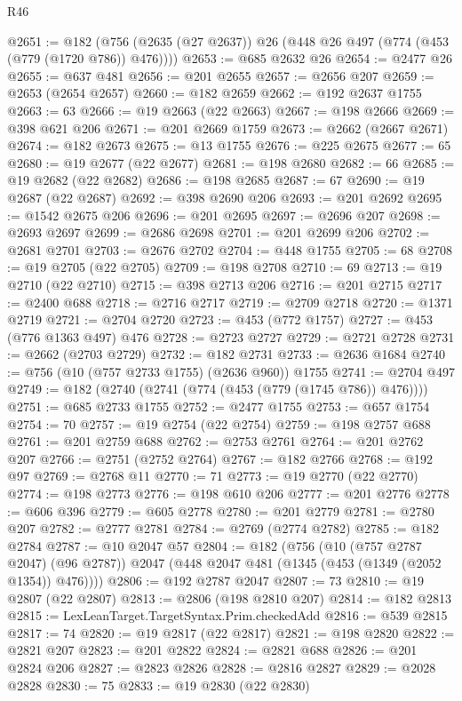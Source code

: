 \begin{lexlean}{R46}
\begin{coremodule}
@2651 := @182 (@756 (@2635 (@27 @2637)) @26 (@448 @26 @497 (@774 (@453 (@779 (@1720 @786)) @476))))
@2653 := @685 @2632 @26
@2654 := @2477 @26
@2655 := @637 @481
@2656 := @201 @2655
@2657 := @2656 @207
@2659 := @2653 (@2654 @2657)
@2660 := @182 @2659
@2662 := @192 @2637 @1755
@2663 := 63
@2666 := @19 @2663 (@22 @2663)
@2667 := @198 @2666
@2669 := @398 @621 @206
@2671 := @201 @2669 @1759
@2673 := @2662 (@2667 @2671)
@2674 := @182 @2673
@2675 := @13 @1755
@2676 := @225 @2675
@2677 := 65
@2680 := @19 @2677 (@22 @2677)
@2681 := @198 @2680
@2682 := 66
@2685 := @19 @2682 (@22 @2682)
@2686 := @198 @2685
@2687 := 67
@2690 := @19 @2687 (@22 @2687)
@2692 := @398 @2690 @206
@2693 := @201 @2692
@2695 := @1542 @2675 @206
@2696 := @201 @2695
@2697 := @2696 @207
@2698 := @2693 @2697
@2699 := @2686 @2698
@2701 := @201 @2699 @206
@2702 := @2681 @2701
@2703 := @2676 @2702
@2704 := @448 @1755
@2705 := 68
@2708 := @19 @2705 (@22 @2705)
@2709 := @198 @2708
@2710 := 69
@2713 := @19 @2710 (@22 @2710)
@2715 := @398 @2713 @206
@2716 := @201 @2715
@2717 := @2400 @688
@2718 := @2716 @2717
@2719 := @2709 @2718
@2720 := @1371 @2719
@2721 := @2704 @2720
@2723 := @453 (@772 @1757)
@2727 := @453 (@776 @1363 @497) @476
@2728 := @2723 @2727
@2729 := @2721 @2728
@2731 := @2662 (@2703 @2729)
@2732 := @182 @2731
@2733 := @2636 @1684
@2740 := @756 (@10 (@757 @2733 @1755) (@2636 @960)) @1755
@2741 := @2704 @497
@2749 := @182 (@2740 (@2741 (@774 (@453 (@779 (@1745 @786)) @476))))
@2751 := @685 @2733 @1755
@2752 := @2477 @1755
@2753 := @657 @1754
@2754 := 70
@2757 := @19 @2754 (@22 @2754)
@2759 := @198 @2757 @688
@2761 := @201 @2759 @688
@2762 := @2753 @2761
@2764 := @201 @2762 @207
@2766 := @2751 (@2752 @2764)
@2767 := @182 @2766
@2768 := @192 @97
@2769 := @2768 @11
@2770 := 71
@2773 := @19 @2770 (@22 @2770)
@2774 := @198 @2773
@2776 := @198 @610 @206
@2777 := @201 @2776
@2778 := @606 @396
@2779 := @605 @2778
@2780 := @201 @2779
@2781 := @2780 @207
@2782 := @2777 @2781
@2784 := @2769 (@2774 @2782)
@2785 := @182 @2784
@2787 := @10 @2047 @57
@2804 := @182
    (@756
      (@10 (@757 @2787 @2047) (@96 @2787))
      @2047
      (@448 @2047 @481 (@1345 (@453 (@1349 (@2052 @1354)) @476))))
@2806 := @192 @2787 @2047
@2807 := 73
@2810 := @19 @2807 (@22 @2807)
@2813 := @2806 (@198 @2810 @207)
@2814 := @182 @2813
@2815 := LexLeanTarget.TargetSyntax.Prim.checkedAdd
@2816 := @539 @2815
@2817 := 74
@2820 := @19 @2817 (@22 @2817)
@2821 := @198 @2820
@2822 := @2821 @207
@2823 := @201 @2822
@2824 := @2821 @688
@2826 := @201 @2824 @206
@2827 := @2823 @2826
@2828 := @2816 @2827
@2829 := @2028 @2828
@2830 := 75
@2833 := @19 @2830 (@22 @2830)

\end{coremodule}
\end{lexlean}
